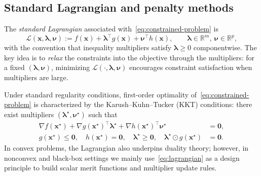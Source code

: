 \documentclass[11pt,a4paper]{article}
\numberwithin{equation}{section}
\numberwithin{figure}{section}
\numberwithin{table}{section}
\theoremstyle{definition}
\newcommand{\R}{\mathbb{R}}
\begin{document}
\subsection{Standard Lagrangian and penalty methods}\label{subsec:al-lag-pen}
The \emph{standard Lagrangian} associated with~\eqref{eq:constrained-problem} is
\begin{equation}
\label{eq:lagrangian}
  \mathcal{L}(\bm{x},\bm{\lambda},\bm{\nu})
  := f(\bm{x}) + \bm{\lambda}^\top g(\bm{x}) + \bm{\nu}^\top h(\bm{x}),
  \qquad \bm{\lambda}\in\R^m,\ \bm{\nu}\in\R^p,
\end{equation}
with the convention that inequality multipliers satisfy $\bm{\lambda}\ge 0$ componentwise. The key idea is to \emph{relax} the constraints into the objective through the multipliers: for a fixed $(\bm{\lambda},\bm{\nu})$, minimizing $\mathcal{L}(\cdot,\bm{\lambda},\bm{\nu})$ encourages constraint satisfaction when multipliers are large.

Under standard regularity conditions, first-order optimality of~\eqref{eq:constrained-problem} is characterized by the Karush--Kuhn--Tucker (KKT) conditions: there exist multipliers $(\bm{\lambda}^\star,\bm{\nu}^\star)$ such that
\begin{align}
  \nabla f(\bm{x}^\star) + \nabla g(\bm{x}^\star)^\top \bm{\lambda}^\star + \nabla h(\bm{x}^\star)^\top \bm{\nu}^\star &= \bm{0},
  \label{eq:kkt-stationarity}\\
  g(\bm{x}^\star)\le \bm{0},\quad h(\bm{x}^\star)=\bm{0},\quad \bm{\lambda}^\star\ge \bm{0},\quad \bm{\lambda}^\star\odot g(\bm{x}^\star) &= \bm{0}.
  \label{eq:kkt-feas}
\end{align}
In convex problems, the Lagrangian also underpins duality theory; however, in nonconvex and black-box settings we mainly use~\eqref{eq:lagrangian} as a design principle to build scalar merit functions and multiplier update rules.\cite{NocedalWright}
\end{document}
